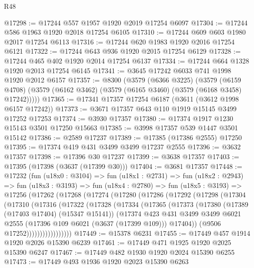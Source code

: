 \begin{lexlean}{R48}
\begin{coremodule}
@17298 := @17244 @557 @1957 @1920 @2019 @17254 @6097
@17304 := @17244 @586 @1963 @1920 @2018 @17254 @6105
@17310 := @17244 @609 @603 @1980 @2017 @17254 @6113
@17316 := @17244 @620 @1983 @1920 @2016 @17254 @6121
@17322 := @17244 @643 @936 @1920 @2015 @17254 @6129
@17328 := @17244 @465 @402 @1920 @2014 @17254 @6137
@17334 := @17244 @664 @1328 @1920 @2013 @17254 @6145
@17341 := @3645 @17242 @6033 @741 @1998 @1920 @2012 @6157
@17357 := @8300
    (@3579
      (@6366 @3225)
      (@3579
        (@6159 @4708)
        (@3579 (@6162 @3462) (@3579 (@6165 @3460) (@3579 (@6168 @3458) @17242)))))
@17365 := @17341 @17357 @17254 @6187 (@3611 (@3612 @1998 @6157 @17242))
@17373 := @3671 @17357 @643 @110 @1919 @15145 @3499 @17252 @17253
@17374 := @3930 @17357
@17380 := @17374 @1917 @1230 @15143 @3501 @17250 @15663
@17385 := @3998 @17357 @539 @1447 @3501 @15142
@17386 := @2589 @17237
@17389 := @17385 (@17386 @2555) @17250
@17395 := @17374 @419 @431 @3499 @3499 @17237 @2555
@17396 := @3632 @17357
@17398 := @17396 @30 @17237
@17399 := @3638 @17357
@17403 := @17395 (@17398 (@3637 (@17399 @30)))
@17404 := @3681 @17357
@17448 := @17232
    (fun (u18x0 : @3104) =>
    fun (u18x1 : @2731) =>
    fun (u18x2 : @2943) =>
    fun (u18x3 : @3193) =>
    fun (u18x4 : @2780) =>
    fun (u18x5 : @3193) =>
    @17256
      (@17262
        (@17268
          (@17274
            (@17280
              (@17286
                (@17292
                  (@17298
                    (@17304
                      (@17310
                        (@17316
                          (@17322
                            (@17328
                              (@17334
                                (@17365
                                  (@17373
                                    (@17380
                                      (@17389 (@17403 @17404) (@15347 @15141))
                                      (@17374
                                        @423
                                        @431
                                        @3499
                                        @3499
                                        @6021
                                        @2555
                                        (@17396 @109 @6021 (@3637 (@17399 @109)))
                                        @17404))
                                    (@9506 @17252)))))))))))))))))
@17449 := @15378 @6231
@17455 := @17449 @457 @1914 @1920 @2026 @15390 @6239
@17461 := @17449 @471 @1925 @1920 @2025 @15390 @6247
@17467 := @17449 @482 @1930 @1920 @2024 @15390 @6255
@17473 := @17449 @493 @1936 @1920 @2023 @15390 @6263

\end{coremodule}
\end{lexlean}
